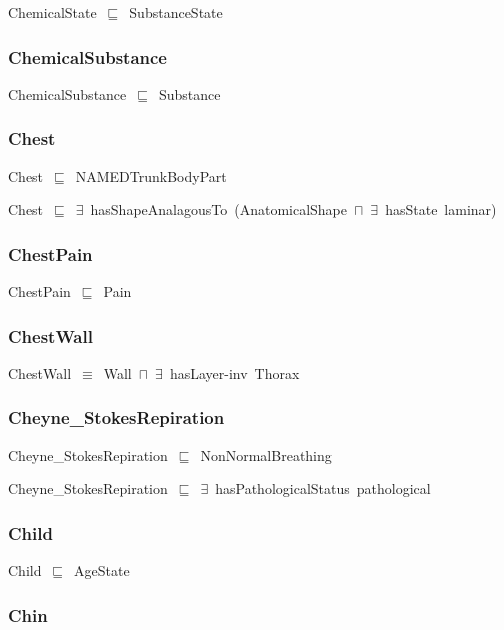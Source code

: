 \documentclass{article}
\begin{document}
ChemicalState~\ensuremath{\sqsubseteq}~SubstanceState~

\subsubsection*{ChemicalSubstance}

ChemicalSubstance~\ensuremath{\sqsubseteq}~Substance~

\subsubsection*{Chest}

Chest~\ensuremath{\sqsubseteq}~NAMEDTrunkBodyPart~

Chest~\ensuremath{\sqsubseteq}~\ensuremath{\exists}~hasShapeAnalagousTo~(AnatomicalShape~\ensuremath{\sqcap}~\ensuremath{\exists}~hasState~laminar)~

\subsubsection*{ChestPain}

ChestPain~\ensuremath{\sqsubseteq}~Pain~

\subsubsection*{ChestWall}

ChestWall~\ensuremath{\equiv}~Wall~\ensuremath{\sqcap}~\ensuremath{\exists}~hasLayer-inv~Thorax

\subsubsection*{Cheyne_StokesRepiration}

Cheyne\_StokesRepiration~\ensuremath{\sqsubseteq}~NonNormalBreathing~

Cheyne\_StokesRepiration~\ensuremath{\sqsubseteq}~\ensuremath{\exists}~hasPathologicalStatus~pathological~

\subsubsection*{Child}

Child~\ensuremath{\sqsubseteq}~AgeState~

\subsubsection*{Chin}
\end{document}
